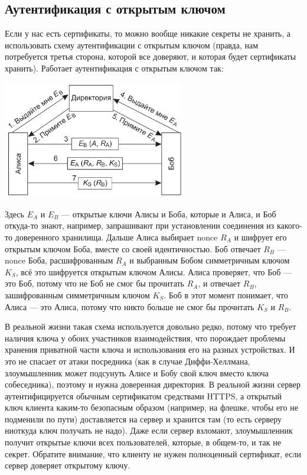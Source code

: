 \documentclass{../../text-style}
\begin{document}
\subsection{Аутентификация с открытым ключом}

Если у нас есть сертификаты, то можно вообще никакие секреты не хранить, а использовать схему аутентификации с открытым ключом (правда, нам потребуется третья сторона, которой все доверяют, и которая будет сертификаты хранить). Работает аутентификация с открытым ключом так:

\begin{center}
    \includegraphics[width=0.6\textwidth]{openKeyAuthentication.png}
\end{center}

Здесь $E_A$ и $E_B$ --- открытые ключи Алисы и Боба, которые и Алиса, и Боб откуда-то знают, например, запрашивают при установлении соединения из какого-то доверенного хранилища. Дальше Алиса выбирает nonce $R_A$ и шифрует его открытым ключом Боба, вместе со своей идентичностью. Боб отвечает $R_B$ --- nonce Боба, расшифрованным $R_A$ и выбранным Бобом симметричным ключом $K_S$, всё это шифруется открытым ключом Алисы. Алиса проверяет, что Боб --- это Боб, потому что не Боб не смог бы прочитать $R_A$, и отвечает $R_B$, зашифрованным симметричным ключом $K_S$. Боб в этот момент понимает, что Алиса --- это Алиса, потому что никто больше не смог бы прочитать $K_S$ и $R_B$.

В реальной жизни такая схема используется довольно редко, потому что требует наличия ключа у обоих участников взаимодействия, что порождает проблемы хранения приватной части ключа и использования его на разных устройствах. И это не спасает от атаки посредника (как в случае Диффи-Хеллмана, злоумышленник может подсунуть Алисе и Бобу свой ключ вместо ключа собеседника), поэтому и нужна доверенная директория. В реальной жизни сервер аутентифицируется обычным сертификатом средствами HTTPS, а открытый ключ клиента каким-то безопасным образом (например, на флешке, чтобы его не подменили по пути) доставляется на сервер и хранится там (то есть серверу ниоткуда ключ получать не надо). Даже если сервер взломают, злоумышленник получит открытые ключи всех пользователей, которые, в общем-то, и так не секрет. Обратите внимание, что клиенту не нужен полноценный сертификат, если сервер доверяет открытому ключу.
\end{document}
